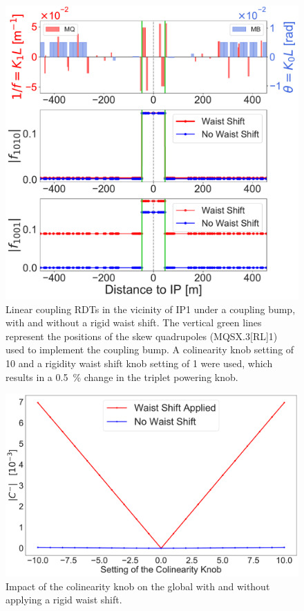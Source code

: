 \begin{figure}[!htb]
    \centering
    \includegraphics*[width=\columnwidth]{Figures/Chapter4/waist_shift_leaks_rdts.pdf}
    \caption{Linear coupling RDTs in the vicinity of IP1 under a coupling bump, with and without a rigid waist shift. The vertical green lines represent the positions of the skew quadrupoles (MQSX.3[RL]1) used to implement the coupling bump. A colinearity knob setting of 10 and a rigidity waist shift knob setting of 1 were used, which results in a \qty{0.5}{\percent} change in the triplet powering knob.}
    \label{fig:rdt_leak}
\end{figure}


\begin{figure}[!htb]
    \centering
    \includegraphics*[width=0.99\columnwidth]{Figures/Chapter4/colin_knob_vs_waist_shift.pdf}
    \caption{Impact of the colinearity knob on the global \AbsCminus with and without applying a rigid waist shift.}
    \label{fig:knob_to_cminus_with_waist}
\end{figure}


